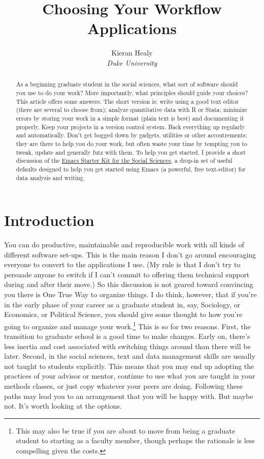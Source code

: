 \documentclass[11pt,article,oneside]{memoir}
\title{Choosing Your Workflow Applications}
\author{Kieran Healy \\ \emph{Duke University}}
\date{}
\begin{document}
\maketitle


\thispagestyle{kjhgit}

\begin{abstract}
  As a beginning graduate student in the social sciences, what sort of
  software should you use to do your work? More importantly, what
  principles should guide your choices? This article offers some
  answers. The short version is: write using a good text editor (there
  are several to choose from); analyze quantitative data with R or
  Stata; minimize errors by storing your work in a simple format
  (plain text is best) and documenting it properly. Keep your projects
  in a version control system. Back everything up regularly and
  automatically. Don't get bogged down by gadgets, utilities or other
  accoutrements: they are there to help you do your work, but often
  waste your time by tempting you to tweak, update and generally futz
  with them. To help you get started, I provide a short discussion of
  the \href{http://kjhealy.github.com/emacs-starter-kit/}{Emacs
    Starter Kit for the Social Sciences}, a drop-in set of useful
  defaults designed to help you get started using Emacs (a powerful,
  free text-editor) for data analysis and writing.
\end{abstract}

\section*{Introduction}
\label{sec-1}

You can do productive, maintainable and reproducible work with all
kinds of different software set-ups. This is the main reason I don't go around encouraging
everyone to convert to the applications I use. (My rule is that I
don't try to persuade anyone to switch if I can't commit to offering
them technical support during and after their move.) So this
discussion is not geared toward convincing you there is One True Way
to organize things. I do think, however, that if you're in the early
phase of your career as a graduate student in, say, Sociology, or
Economics, or Political Science, you should give some thought to how
you're going to organize and manage your work.\footnote{This may also
  be true if you are about to move from being a graduate student to
  starting as a faculty member, though perhaps the rationale is less
  compelling given the costs. } This is so for two reasons. First, the
transition to graduate school is a good time to make changes. Early
on, there's less inertia and cost associated with switching things
around than there will be later. Second, in the social sciences, text
and data management skills are usually not taught to students
explicitly. This means that you may end up adopting the practices of
your advisor or mentor, continue to use what you are taught in your
methods classes, or just copy whatever your peers are doing. Following
these paths may lead you to an arrangement that you will be happy
with. But maybe not. It's worth looking at the options.
\end{document}
